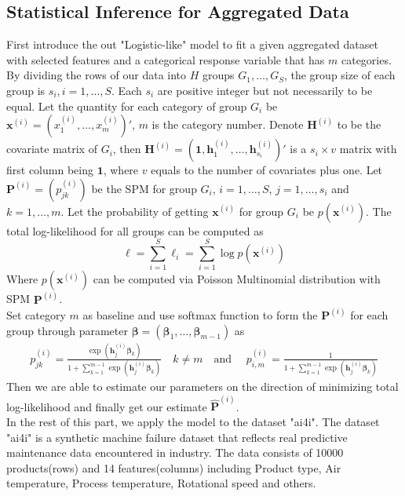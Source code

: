 \documentclass[12pt]{article}
\begin{document}
\subsection{Statistical Inference for Aggregated Data}\label{sec:model.est.inf}	
First introduce the out "Logistic-like" model to fit a given aggregated dataset with selected features and a categorical response variable that has $m$ categories. By dividing the rows of our data into $H$ groups $G_1,\dots,G_{S}$, the group size of each group is $s_i,i=1,\dots,S$. Each $s_i$ are positive integer but not necessarily to be equal. Let the quantity for each category of group $G_i$ be $\boldsymbol{x}^{(i)} = (x_1^{(i)}, \dots, x_m^{(i)})'$, $m$ is the category number. Denote $\boldsymbol{H}^{(i)}$ to be the covariate matrix of $G_i$, then $\boldsymbol{H}^{(i)} = (\boldsymbol{1}, \boldsymbol{h}_{1}^{(i)},\dots,\boldsymbol{h}_{s_i}^{(i)})'$ is a $s_i \times v$ matrix with first column being $\boldsymbol{1}$, where $v$ equals to the number of covariates plus one. Let $\boldsymbol{P}^{(i)} = (p_{jk}^{(i)})$ be the SPM for group $G_i$, $i = 1, \dots, S$, $j = 1,\dots ,s_i$ and $k = 1,\dots, m$. Let the probability of getting $\boldsymbol{x}^{(i)}$ for group $G_i$ be $p(\boldsymbol{x}^{(i)})$. The total log-likelihood for all groups can be computed as
\begin{equation*}
    \ell = \sum_{i=1}^{S}\ell_i = \sum_{i=1}^{S}\log p(\boldsymbol{x}^{(i)})
\end{equation*}
Where $p(\boldsymbol{x}^{(i)})$ can be computed via Poisson Multinomial distribution with SPM $\boldsymbol{P}^{(i)}$.\\
Set category $m$ as baseline and use softmax function to form the $\boldsymbol{P}^{(i)}$ for each group through parameter $\boldsymbol{\beta} = (\boldsymbol{\beta}_1, \dots, \boldsymbol{\beta}_{m-1})$ as
\begin{align*}
    p_{j k}^{(i)} = \frac{\exp{\left(\boldsymbol{h}_{j}^{(i)} \boldsymbol{\beta}_{k}\right)}}{1 + \sum_{k=1}^{m-1}\exp{\left( \boldsymbol{h}_{j}^{(i)} \boldsymbol{\beta}_{k} \right)}} 
    \quad k \neq m \quad \text{and } \quad
    p_{i,m}^{(i)} = \frac{1}{1 + \sum_{k=1}^{m-1}\exp{\left( \boldsymbol{h}_{j}^{(i)} \boldsymbol{\beta}_{k} \right)}}
\end{align*}
Then we are able to estimate our parameters on the direction of minimizing total log-likelihood and finally get our estimate $\hat{\boldsymbol{P}}^{(i)}$. \\

In the rest of this part, we apply the model to the dataset "ai4i". The dataset "ai4i" is a synthetic machine failure dataset that reflects real predictive maintenance data encountered in industry. The data consists of 10000 products(rows) and 14 features(columns) including Product type, Air temperature, Process temperature, Rotational speed and others. \\
\end{document}
